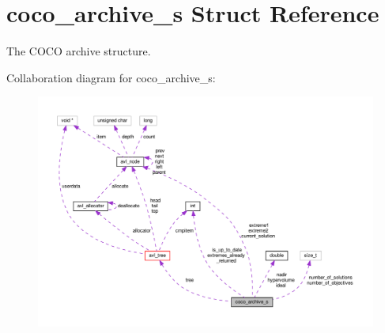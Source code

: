 \hypertarget{structcoco__archive__s}{}\section{coco\+\_\+archive\+\_\+s Struct Reference}
\label{structcoco__archive__s}


The C\+O\+CO archive structure.  




Collaboration diagram for coco\+\_\+archive\+\_\+s\+:\nopagebreak
\begin{figure}[H]
\begin{center}
\leavevmode
\includegraphics[width=350pt]{structcoco__archive__s__coll__graph}
\end{center}
\end{figure}
